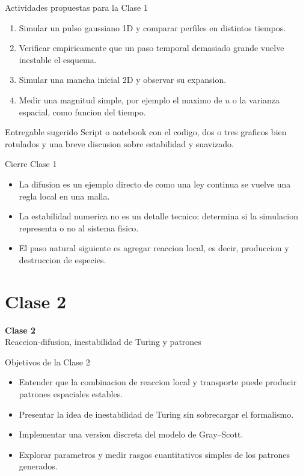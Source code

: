 \begin{frame}{Actividades propuestas para la Clase 1}
\begin{enumerate}
    \item Simular un pulso gaussiano 1D y comparar perfiles en distintos tiempos.
    \item Verificar empiricamente que un paso temporal demasiado grande vuelve inestable el esquema.
    \item Simular una mancha inicial 2D y observar su expansion.
    \item Medir una magnitud simple, por ejemplo el maximo de $u$ o la varianza espacial, como funcion del tiempo.
\end{enumerate}

\begin{block}{Entregable sugerido}
Script o notebook con el codigo, dos o tres graficos bien rotulados y una breve discusion sobre estabilidad y suavizado.
\end{block}
\end{frame}

\begin{frame}{Cierre Clase 1}
\begin{itemize}
    \item La difusion es un ejemplo directo de como una ley continua se vuelve una regla local en una malla.
    \item La estabilidad numerica no es un detalle tecnico: determina si la simulacion representa o no al sistema fisico.
    \item El paso natural siguiente es agregar reaccion local, es decir, produccion y destruccion de especies.
\end{itemize}
\end{frame}

\section{Clase 2}

\begin{frame}[plain]
\centering
\vfill
{\Huge \bfseries Clase 2}\\[0.4cm]
{\Large Reaccion-difusion, inestabilidad de Turing y patrones}
\vfill
\end{frame}

\begin{frame}{Objetivos de la Clase 2}
\begin{itemize}
    \item Entender que la combinacion de reaccion local y transporte puede producir patrones espaciales estables.
    \item Presentar la idea de inestabilidad de Turing sin sobrecargar el formalismo.
    \item Implementar una version discreta del modelo de Gray--Scott.
    \item Explorar parametros y medir rasgos cuantitativos simples de los patrones generados.
\end{itemize}
\end{frame}

